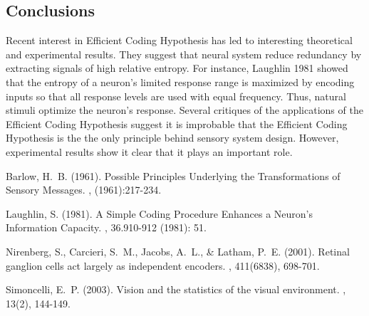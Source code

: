 \documentclass[twoside]{article}
\begin{document}
\begin{multicols}{2}

\section{Conclusions}

Recent interest in Efficient Coding Hypothesis has led to interesting theoretical and experimental results. They suggest that neural system reduce redundancy by extracting signals of high relative entropy. For instance, Laughlin 1981 showed that the entropy of a neuron’s limited response range is maximized by encoding inputs so that all response levels are used with equal frequency. Thus, natural stimuli optimize the neuron's response. Several critiques of the applications of the Efficient Coding Hypothesis suggest it is improbable that the Efficient Coding Hypothesis is the the only principle behind sensory system design. However, experimental results show it clear that it plays an important role.




\begin{thebibliography}{99} 

Barlow, H.~B. (1961).
\newblock Possible Principles Underlying the Transformations of Sensory Messages.
, (1961):217-234.

Laughlin, S. (1981).
\newblock A Simple Coding Procedure Enhances a Neuron's Information Capacity.
, 36.910-912 (1981): 51.

Nirenberg, S., Carcieri, S.~M., Jacobs, A.~L., \& Latham, P.~E. (2001).
\newblock Retinal ganglion cells act largely as independent encoders.
, 411(6838), 698-701.

Simoncelli, E.~P. (2003).
\newblock  Vision and the statistics of the visual environment.
, 13(2), 144-149.


\end{thebibliography}
\end{multicols}
\end{document}
